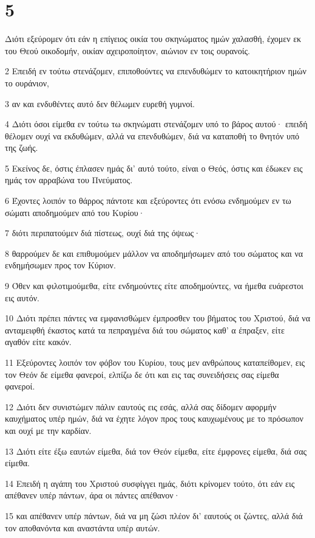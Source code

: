 \chapter{5}

\par Διότι εξεύρομεν ότι εάν η επίγειος οικία του σκηνώματος ημών χαλασθή, έχομεν εκ του Θεού οικοδομήν, οικίαν αχειροποίητον, αιώνιον εν τοις ουρανοίς.
\par 2 Επειδή εν τούτω στενάζομεν, επιποθούντες να επενδυθώμεν το κατοικητήριον ημών το ουράνιον,
\par 3 αν και ενδυθέντες αυτό δεν θέλωμεν ευρεθή γυμνοί.
\par 4 Διότι όσοι είμεθα εν τούτω τω σκηνώματι στενάζομεν υπό το βάρος αυτού· επειδή θέλομεν ουχί να εκδυθώμεν, αλλά να επενδυθώμεν, διά να καταποθή το θνητόν υπό της ζωής.
\par 5 Εκείνος δε, όστις έπλασεν ημάς δι' αυτό τούτο, είναι ο Θεός, όστις και έδωκεν εις ημάς τον αρραβώνα του Πνεύματος.
\par 6 Έχοντες λοιπόν το θάρρος πάντοτε και εξεύροντες ότι ενόσω ενδημούμεν εν τω σώματι αποδημούμεν από του Κυρίου·
\par 7 διότι περιπατούμεν διά πίστεως, ουχί διά της όψεως·
\par 8 θαρρούμεν δε και επιθυμούμεν μάλλον να αποδημήσωμεν από του σώματος και να ενδημήσωμεν προς τον Κύριον.
\par 9 Όθεν και φιλοτιμούμεθα, είτε ενδημούντες είτε αποδημούντες, να ήμεθα ευάρεστοι εις αυτόν.
\par 10 Διότι πρέπει πάντες να εμφανισθώμεν έμπροσθεν του βήματος του Χριστού, διά να ανταμειφθή έκαστος κατά τα πεπραγμένα διά του σώματος καθ' α έπραξεν, είτε αγαθόν είτε κακόν.
\par 11 Εξεύροντες λοιπόν τον φόβον του Κυρίου, τους μεν ανθρώπους καταπείθομεν, εις τον Θεόν δε είμεθα φανεροί, ελπίζω δε ότι και εις τας συνειδήσεις σας είμεθα φανεροί.
\par 12 Διότι δεν συνιστώμεν πάλιν εαυτούς εις εσάς, αλλά σας δίδομεν αφορμήν καυχήματος υπέρ ημών, διά να έχητε λόγον προς τους καυχωμένους με το πρόσωπον και ουχί με την καρδίαν.
\par 13 Διότι είτε έξω εαυτών είμεθα, διά τον Θεόν είμεθα, είτε έμφρονες είμεθα, διά σας είμεθα.
\par 14 Επειδή η αγάπη του Χριστού συσφίγγει ημάς, διότι κρίνομεν τούτο, ότι εάν εις απέθανεν υπέρ πάντων, άρα οι πάντες απέθανον·
\par 15 και απέθανεν υπέρ πάντων, διά να μη ζώσι πλέον δι' εαυτούς οι ζώντες, αλλά διά τον αποθανόντα και αναστάντα υπέρ αυτών.
